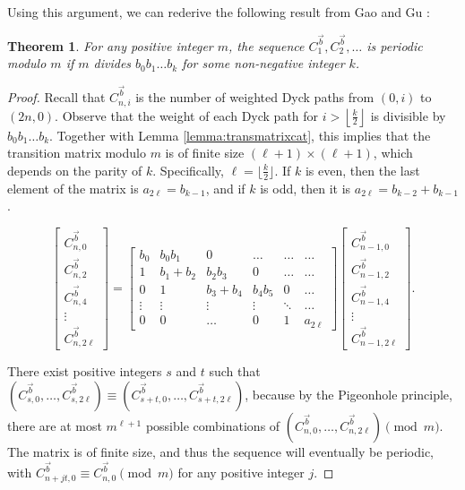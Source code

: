 \documentclass[12pt,notitlepage]{amsart}
\numberwithin{equation}{section}
\theoremstyle{thmstyleone}%
\newtheorem{theorem}{Theorem}[section]%
\theoremstyle{thmstyletwo}%
\theoremstyle{thmstylethree}%
\numberwithin{theorem}{section}
\numberwithin{equation}{section}
\begin{document}
Using this argument, we can rederive the following result from Gao and Gu \cite{gaogu}:
\begin{theorem}
    \label{theorem:general-periodicity}
    For any positive integer $m$, the sequence $C^{\vec{b}}_{1}, C^{\vec{b}}_2, \dots$ is periodic modulo $m$ if $m$ divides $b_0b_1\ldots b_k$ for some non-negative integer $k$. 
\end{theorem}

\begin{proof}
Recall that $C^{\vec{b}}_{n,i}$ is the number of weighted Dyck paths from $(0,i)$ to $(2n,0)$. Observe that the weight of each Dyck path for $i > \left\lfloor \frac{k}{2} \right\rfloor$ is divisible by $b_0b_1\ldots b_k$. Together with Lemma \ref{lemma:transmatrixcat}, this implies that the transition matrix modulo $m$ is of finite size $(\ell + 1) \times (\ell + 1)$, which depends on the parity of $k$. Specifically, $\ell = \lfloor \frac{k}{2} \rfloor.$ If $k$ is even, then the last element of the matrix is $a_{2\ell} = b_{k-1}$, and if $k$ is odd, then it is ${a_{2\ell}} = b_{k-2}+b_{k-1}$. 

\[\begin{bmatrix}
C^{\vec{b}}_{n,0} \\
C^{\vec{b}}_{n,2} \\
C^{\vec{b}}_{n,4} \\
\vdots \\
C^{\vec{b}}_{n,2 \ell}
\end{bmatrix} = 
\begin{bmatrix}
b_0 & b_0 b_1 & 0 & \dots  &\dots &\dots \\
1 & b_1 + b_2 & b_2 b_3 & 0 & \dots &\dots \\
0 & 1 & b_3 + b_4 & b_4 b_5 & 0 & \dots \\
\vdots & \vdots & \vdots & \vdots & \ddots &\dots \\
0 & 0 & \dots & 0 & 1 & a_{2 \ell}
\end{bmatrix}
\begin{bmatrix}
C^{\vec{b}}_{n-1,0} \\
C^{\vec{b}}_{n-1,2} \\
C^{\vec{b}}_{n-1,4} \\
\vdots \\
C^{\vec{b}}_{n-1,2 \ell}
\end{bmatrix}.
\]

There exist positive integers $s$ and $t$ such that $(C^{\vec{b}}_{s,0}, \ldots, C^{\vec{b}}_{s,2\ell}) \equiv  (C^{\vec{b}}_{s+t,0}, \ldots, C^{\vec{b}}_{s+t,2\ell})$, because by the Pigeonhole principle, there are at most $m^{\ell+1}$ possible combinations of $(C^{\vec{b}}_{n,0}, \ldots, C^{\vec{b}}_{n,2\ell}) \pmod m$. The matrix is of finite size, and thus the sequence will eventually be periodic, with $C^{\vec{b}}_{n+jt,0} \equiv C^{\vec{b}}_{n,0} \pmod m$ for any positive integer $j$. \end{proof}
\end{document}
